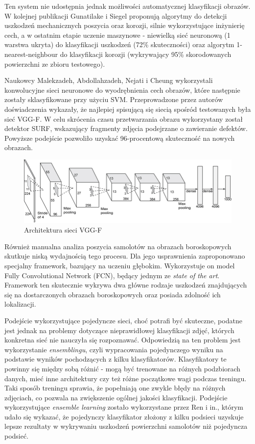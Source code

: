 \documentclass[polish,12pt]{aghthesis}
\begin{document}
Ten system nie udostępnia jednak możliwości automatycznej klasyfikacji obrazów. W kolejnej\cite{artSiegel2} publikacji Gunatilake i Siegel proponują algorytmy do detekcji uszkodzeń mechanicznych poszycia oraz korozji, silnie wykorzystujące inżynierię cech, a w ostatnim etapie uczenie maszynowe - niewielką sieć neuronową (1 warstwa ukryta) do klasyfikacji uszkodzeń (72\% skuteczności) oraz algorytm 1-nearest-neighbour do klasyfikacji korozji (wykrywający 95\% skorodowanych powierzchni ze zbioru testowego).
\par
Naukowcy Malekzadeh, Abdollahzadeh, Nejati i Cheung\cite{artMalekzadeh} wykorzystali konwolucyjne sieci neuronowe do wyodrębnienia cech obrazów, które następnie zostały sklasyfikowane przy użyciu SVM. Przeprowadzone przez autorów doświadczenia wykazały, że najlepiej spisującą się siecią spośród testowanych była sieć VGG-F. W celu skrócenia czasu przetwarzania obrazu wykorzystany został detektor SURF, wskazujący fragmenty zdjęcia podejrzane o zawieranie defektów. Powyższe podejście pozwoliło uzyskać 96-procentową skuteczność na nowych obrazach. 
\begin{figure}[ht]
    \centering
    \includegraphics[width=12cm]{images/vgg-f.png}
    \caption{Architektura sieci VGG-F\cite{artVggf}}
    \label{fig:vgg-f}
\end{figure}
\par
Również manualna analiza poszycia samolotów na obrazach boroskopowych skutkuje niską wydajnością tego procesu. Dla jego usprawnienia zaproponowano specjalny framework\cite{artShen}, bazujący na uczeniu głębokim. Wykorzystuje on model Fully Convolutional Network (FCN), będący jednym ze \textit{state of the art}. Framework ten skutecznie wykrywa dwa główne rodzaje uszkodzeń znajdujących się na dostarczonych obrazach boroskopowych oraz posiada zdolność ich lokalizacji.
\par
Podejście wykorzystujące pojedyncze sieci, choć potrafi być skuteczne, podatne jest jednak na problemy dotyczące nieprawidłowej klasyfikacji zdjęć, których konkretna sieć nie nauczyła się rozpoznawać. Odpowiedzią na ten problem jest wykorzystanie \textit{ensemblingu}, czyli wypracowania pojedynczego wyniku na podstawie wyników pochodzących z kilku klasyfikatorów. Klasyfikatory te powinny się między sobą różnić - mogą być trenowane na różnych podzbiorach danych, mieć inne architektury czy też różne początkowe wagi podczas treningu. Taki sposób treningu sprawia, że popełniają one zwykle błędy na różnych zdjęciach, co pozwala na zwiększenie ogólnej jakości klasyfikacji. Podejście wykorzystujące \textit{ensemble learning} zostało wykorzystane przez Ren i in., którym udało się wykazać, że pojedynczy klasyfikator złożony z kilku podsieci uzyskuje lepsze rezultaty w wykrywaniu uszkodzeń powierzchni samolotów niż pojedyncza podsieć\cite{artRen}.
\end{document}
